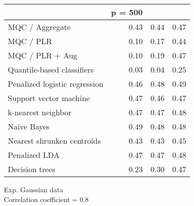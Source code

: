 \begin{table}[p]
\begin{minipage}{0.49\textwidth}
{\begin{tabular}{lrrr}
        \hline
        & p = 500 \\
        \hline

        MQC / Aggregate & 0.43 & 0.44 & 0.47 \\ 
        MQC / PLR & 0.10 & 0.17 & 0.44 \\ 
        MQC / PLR + Aug & 0.10 & 0.19 & 0.47 \\ 
        Quantile-based classifiers & 0.03 & 0.04 & 0.25 \\ 
        Penalized logistic regression & 0.46 & 0.48 & 0.49 \\ 
        Support vector machine & 0.47 & 0.46 & 0.47 \\ 
        k-nearest neighbor & 0.47 & 0.47 & 0.48 \\ 
        Naive Bayes & 0.49 & 0.48 & 0.48 \\ 
        Nearest shrunken centroids & 0.43 & 0.43 & 0.45 \\ 
        Penalized LDA & 0.47 & 0.47 & 0.48 \\ 
        Decision trees & 0.23 & 0.30 & 0.47 \\ 
        \hline
      \end{tabular}
    }
  \end{minipage}
  \begin{minipage}{0.49\textwidth}
    \centering
    Exp. Gaussian data \\
    Correlation coefficient = 0.8 \\[2ex]
\end{minipage}
\end{table}
